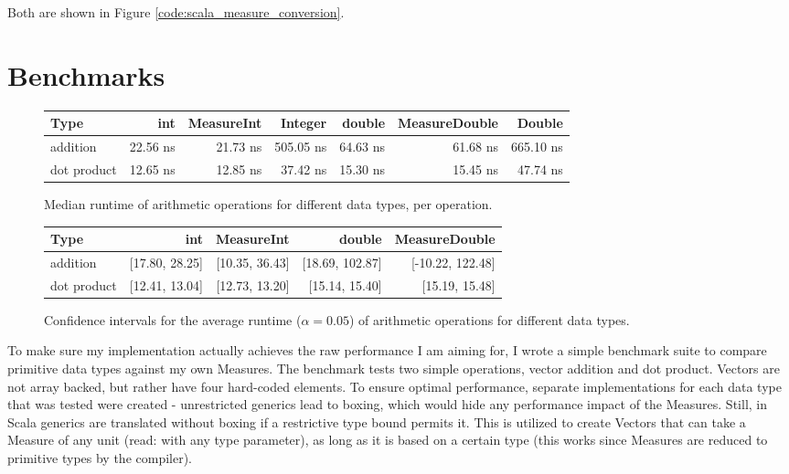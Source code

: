 \documentclass[12pt,oneside,a4paper]{scrbook}
\begin{document}
Both are shown in Figure \ref{code:scala_measure_conversion}.



\chapter{Benchmarks}
\label{cha:bench}

\begin{figure}
\begin{tabular}{lrrrrrr}
Type          & int      & MeasureInt  &    Integer  & double   & MeasureDouble  & Double \\
\midrule
addition      & 22.56 ns &  21.73 ns   &  505.05 ns  & 64.63 ns &  61.68 ns      & 665.10 ns \\
dot product   & 12.65 ns &  12.85 ns   &   37.42 ns  & 15.30 ns &  15.45 ns      &  47.74 ns
\end{tabular}
\caption{Median runtime of arithmetic operations for different data types, per operation.}
\label{bench:scala_measures_median}
\end{figure}

\begin{figure}
\begin{tabular}{lrrrr}
Type          & int             & MeasureInt      &     double      & MeasureDouble  \\
\midrule
addition      & [17.80, 28.25]  & [10.35, 36.43]  & [18.69, 102.87] & [-10.22, 122.48] \\
dot product   & [12.41, 13.04]  & [12.73, 13.20]  &  [15.14, 15.40] &  [15.19, 15.48]
\end{tabular}
\caption{Confidence intervals for the average runtime ($\alpha = 0.05$) of arithmetic operations for different data types.}
\label{bench:scala_measures_interval}
\end{figure}


To make sure my implementation actually achieves the raw performance I am aiming for, I wrote a simple benchmark suite to compare primitive data types against my own Measures. The benchmark tests two simple operations, vector addition and dot product. Vectors are not array backed, but rather have four hard-coded elements. To ensure optimal performance, separate implementations for each data type that was tested were created - unrestricted generics lead to boxing, which would hide any performance impact of the Measures. Still, in Scala generics are translated without boxing if a restrictive type bound permits it. This is utilized to create Vectors that can take a Measure of any unit (read: with any type parameter), as long as it is based on a certain type (this works since Measures are reduced to primitive types by the compiler).
\end{document}
